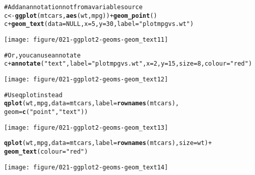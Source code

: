\documentclass[a4paper,titlepage]{tufte-handout}\usepackage{graphicx, color}
\makeatletter
\def\maxwidth{ %
  \ifdim\Gin@nat@width>\linewidth
    \linewidth
  \else
    \Gin@nat@width
  \fi
}
\newcommand{\hlfunctioncall}[1]{\textcolor[rgb]{0.501960784313725,0,0.329411764705882}{\textbf{#1}}}%
\newcommand{\hlstring}[1]{\textcolor[rgb]{0.6,0.6,1}{#1}}%
\newcommand{\hlcomment}[1]{\textcolor[rgb]{0.180392156862745,0.6,0.341176470588235}{#1}}%
\newenvironment{kframe}{%
 \def\at@end@of@kframe{}%
 \ifinner\ifhmode%
  \def\at@end@of@kframe{\end{minipage}}%
  \begin{minipage}{\columnwidth}%
 \fi\fi%
 \def\FrameCommand##1{\hskip\@totalleftmargin \hskip-\fboxsep
 \colorbox{shadecolor}{##1}\hskip-\fboxsep
     \hskip-\linewidth \hskip-\@totalleftmargin \hskip\columnwidth}%
 \MakeFramed {\advance\hsize-\width
   \@totalleftmargin\z@ \linewidth\hsize
   \@setminipage}}%
 {\par\unskip\endMakeFramed%
 \at@end@of@kframe}
\newenvironment{knitrout}{}{} %
\makeatother
\begin{document}
\begin{knitrout}
\begin{kframe}
\begin{alltt}
\hlcomment{# Add an annotation not from a variable source}
c <- \hlfunctioncall{ggplot}(mtcars, \hlfunctioncall{aes}(wt, mpg)) + \hlfunctioncall{geom_point}()
c + \hlfunctioncall{geom_text}(data = NULL, x = 5, y = 30, label = \hlstring{"plot mpg vs. wt"})
\end{alltt}
\end{kframe}
\texttt{[image: figure/021-ggplot2-geoms-geom\_text11]} 
\begin{kframe}\begin{alltt}
\hlcomment{# Or, you can use annotate}
c + \hlfunctioncall{annotate}(\hlstring{"text"}, label = \hlstring{"plot mpg vs. wt"}, x = 2, y = 15, size = 8, colour = \hlstring{"red"})
\end{alltt}
\end{kframe}
\texttt{[image: figure/021-ggplot2-geoms-geom\_text12]} 
\begin{kframe}\begin{alltt}

\hlcomment{# Use qplot instead}
\hlfunctioncall{qplot}(wt, mpg, data = mtcars, label = \hlfunctioncall{rownames}(mtcars),
   geom=\hlfunctioncall{c}(\hlstring{"point"}, \hlstring{"text"}))
\end{alltt}
\end{kframe}
\texttt{[image: figure/021-ggplot2-geoms-geom\_text13]} 
\begin{kframe}\begin{alltt}
\hlfunctioncall{qplot}(wt, mpg, data = mtcars, label = \hlfunctioncall{rownames}(mtcars), size = wt) +
  \hlfunctioncall{geom_text}(colour = \hlstring{"red"})
\end{alltt}
\end{kframe}
\texttt{[image: figure/021-ggplot2-geoms-geom\_text14]} 
\begin{kframe}\begin{alltt}


\end{alltt}
\end{kframe}
\end{knitrout}
\end{document}
